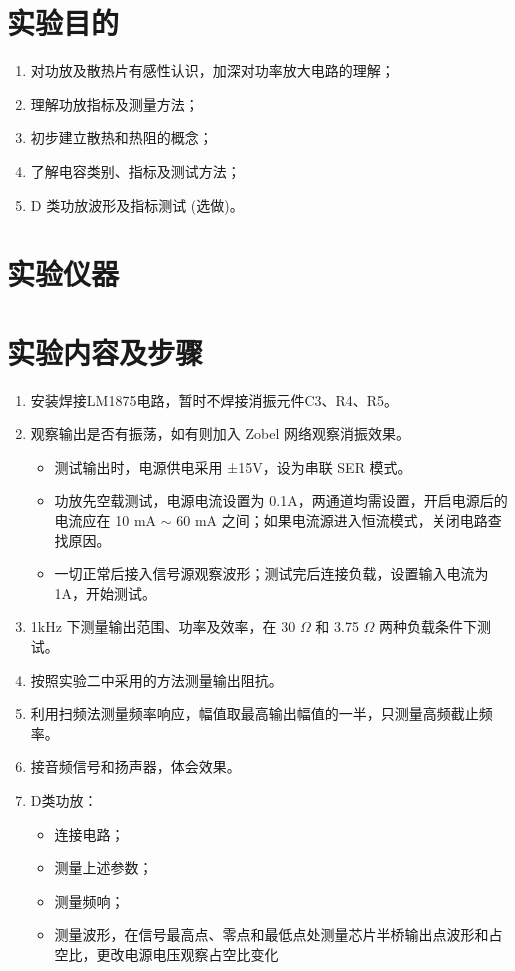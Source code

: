 \documentclass[UTF8]{article}
\begin{document}
\section{实验目的}

\begin{enumerate}
\item 对功放及散热片有感性认识，加深对功率放大电路的理解；
\item 理解功放指标及测量方法；
\item 初步建立散热和热阻的概念；
\item 了解电容类别、指标及测试方法；
\item D 类功放波形及指标测试 (选做)。
\end{enumerate}

\section{实验仪器}

\section{实验内容及步骤}

\begin{enumerate}
    \item 安装焊接LM1875电路，暂时不焊接消振元件C3、R4、R5。
    \item 观察输出是否有振荡，如有则加入 Zobel 网络观察消振效果。
    \begin{itemize}
            \item 测试输出时，电源供电采用 ±15V，设为串联 SER 模式。
            \item 功放先空载测试，电源电流设置为 0.1A，两通道均需设置，开启电源后的电流应在 10 mA  $\sim$ 60 mA 之间；如果电流源进入恒流模式，关闭电路查找原因。
            \item 一切正常后接入信号源观察波形；测试完后连接负载，设置输入电流为1A，开始测试。
    \end{itemize}
    \item 1kHz 下测量输出范围、功率及效率，在 30 $\Omega$ 和 3.75 $\Omega$ 两种负载条件下测试。
    \item 按照实验二中采用的方法测量输出阻抗。
    \item 利用扫频法测量频率响应，幅值取最高输出幅值的一半，只测量高频截止频率。
    \item 接音频信号和扬声器，体会效果。
    \item D类功放：
    \begin{itemize}
        \item 连接电路；
        \item 测量上述参数；
        \item 测量频响；
        \item 测量波形，在信号最高点、零点和最低点处测量芯片半桥输出点波形和占空比，更改电源电压观察占空比变化
    \end{itemize}
\end{enumerate}
\end{document}
